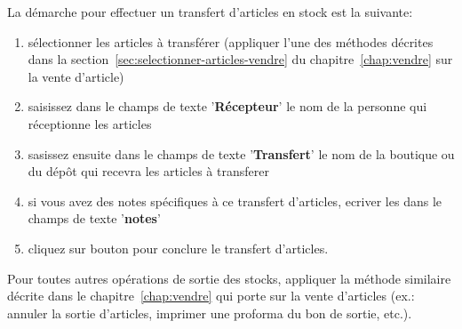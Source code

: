 

La d\'emarche pour effectuer un transfert d'articles en stock
est la suivante:
\begin{enumerate}[1)]
	\item s\'electionner les articles \`a transf\'erer
	(appliquer l'une des m\'ethodes d\'ecrites dans la
	section~\ref{sec:selectionner-articles-vendre}
	du chapitre~\ref{chap:vendre} sur la vente d'article)
		
	\item saisissez dans le champs de texte
	'\textbf{R\'ecepteur}' le nom de la personne
	qui r\'eceptionne les articles
	
	\item sasissez ensuite dans le champs de texte
	'\textbf{Transfert}' le nom de la boutique ou
	du d\'ep\^ot qui recevra les articles \`a transferer
	
	\item si vous avez des notes sp\'ecifiques \`a
	ce transfert d'articles, ecriver les dans 
	le champs de texte '\textbf{notes}'
	
	\item cliquez sur bouton 
	pour conclure le transfert d'articles.
\end{enumerate}



Pour toutes autres op\'erations de sortie des stocks,
appliquer la m\'ethode similaire d\'ecrite dans le
chapitre~\ref{chap:vendre} qui porte sur la vente d'articles
(ex.: annuler la sortie d'articles, imprimer une proforma
du bon de sortie, etc.).
